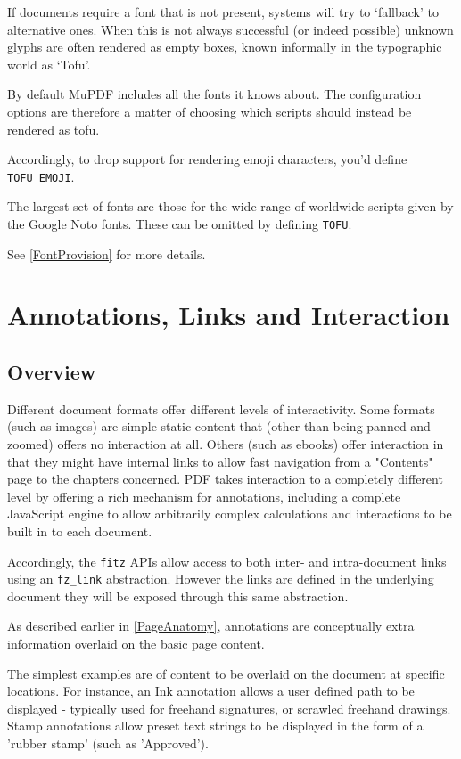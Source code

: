\documentclass[oneside]{book}
\newcommand{\rjwref}[1] {\autoref{#1} \nameref{#1}}
\begin{document}
If documents require a font that is not present, systems will try to `fallback' to alternative ones. When this is not always successful (or indeed possible) unknown glyphs are often rendered as empty boxes, known informally in the typographic world as `Tofu'.

By default MuPDF includes all the fonts it knows about. The configuration options are therefore a matter of choosing which scripts should instead be rendered as tofu.

Accordingly, to drop support for rendering emoji characters, you'd define \texttt{TOFU\_EMOJI}.

The largest set of fonts are those for the wide range of worldwide scripts given by the Google Noto fonts. These can be omitted by defining \texttt{TOFU}.

See \rjwref{FontProvision} for more details.


\chapter{Annotations, Links and Interaction}
\label{Annotations}

\section{Overview}

Different document formats offer different levels of interactivity. Some formats (such as images) are simple static content that (other than being panned and zoomed) offers no interaction at all. Others (such as ebooks) offer interaction in that they might have internal links to allow fast navigation from a "Contents" page to the chapters concerned. PDF takes interaction to a completely different level by offering a rich mechanism for annotations, including a complete JavaScript engine to allow arbitrarily complex calculations and interactions to be built in to each document.

Accordingly, the \texttt{fitz} APIs allow access to both inter- and intra-document links using an \texttt{fz\_link} abstraction. However the links are defined in the underlying document they will be exposed through this same abstraction.

As described earlier in \ref{PageAnatomy}, annotations are conceptually extra information overlaid on the basic page content.

The simplest examples are of content to be overlaid on the document at specific locations. For instance, an Ink annotation allows a user defined path to be displayed - typically used for freehand signatures, or scrawled freehand drawings. Stamp annotations allow preset text strings to be displayed in the form of a 'rubber stamp' (such as 'Approved').
\end{document}
